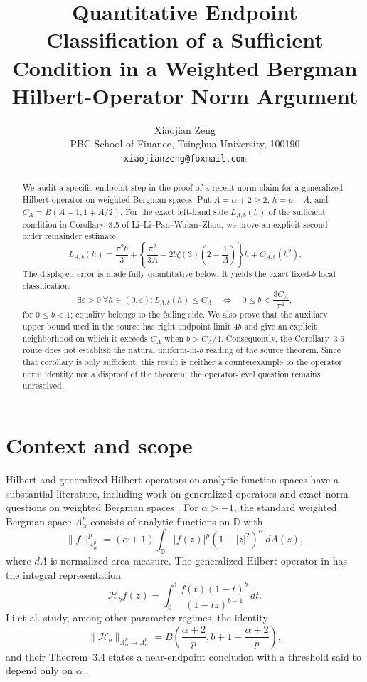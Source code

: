 \documentclass[11pt]{article}
\title{Quantitative Endpoint Classification of a Sufficient Condition in a Weighted Bergman Hilbert-Operator Norm Argument}
\author{Xiaojian Zeng\\
PBC School of Finance, Tsinghua University, 100190\\
\texttt{xiaojianzeng@foxmail.com}}
\date{}
\theoremstyle{remark}
\newcommand{\D}{\mathbb{D}}
\newcommand{\eps}{\varepsilon}
\begin{document}
\maketitle

\begin{abstract}
We audit a specific endpoint step in the proof of a recent norm claim for a
generalized Hilbert operator on weighted Bergman spaces.  Put
$A=\alpha+2\geq2$, $h=p-A$, and
$C_A=B(A-1,1+A/2)$.  For the exact left-hand side $L_{A,b}(h)$ of the
sufficient condition in Corollary~3.5 of Li--Li--Pan--Wulan--Zhou, we prove
an explicit second-order remainder estimate
\[
 L_{A,b}(h)=\frac{\pi^2b}{3}
 +\left\{\frac{\pi^2}{3A}-2b\zeta(3)\left(2-\frac1A\right)\right\}h
 +O_{A,b}(h^2).
\]
The displayed error is made fully quantitative below.  It yields the exact
fixed-$b$ local classification
\[
 \exists\eps>0\ \forall h\in(0,\eps):L_{A,b}(h)\leq C_A
 \quad\Longleftrightarrow\quad
 0\leq b<\frac{3C_A}{\pi^2},
\]
for $0\leq b<1$; equality belongs to the failing side.  We also prove that
the auxiliary upper bound used in the source has right endpoint limit $4b$
and give an explicit neighborhood on which it exceeds $C_A$ when
$b>C_A/4$.  Consequently, the Corollary~3.5 route does not establish the
natural uniform-in-$b$ reading of the source theorem.  Since that corollary
is only sufficient, this result is neither a counterexample to the operator
norm identity nor a disproof of the theorem; the operator-level question
remains unresolved.
\end{abstract}

\section{Context and scope}

Hilbert and generalized Hilbert operators on analytic function spaces have a
substantial literature, including work on generalized operators and exact
norm questions on weighted Bergman spaces
\cite{galanopoulos2014generalized,dai2024norm}.  For $\alpha>-1$, the
standard weighted Bergman space $A_\alpha^p$ consists of analytic functions
on $\D$ with
\[
 \|f\|_{A_\alpha^p}^p
  =(\alpha+1)\int_{\D}|f(z)|^p(1-|z|^2)^\alpha\,dA(z),
\]
where $dA$ is normalized area measure.  The generalized Hilbert operator in
\cite{li2026norm} has the integral representation
\[
 \mathcal H_bf(z)=\int_0^1
 \frac{f(t)(1-t)^b}{(1-tz)^{b+1}}\,dt.
\]
Li et al. study, among other parameter regimes, the identity
\begin{equation}
 \|\mathcal H_b\|_{A_\alpha^p\to A_\alpha^p}
 =B\left(\frac{\alpha+2}{p},
 b+1-\frac{\alpha+2}{p}\right),                         \label{eq:norm}
\end{equation}
and their Theorem~3.4 states a near-endpoint conclusion with a threshold
said to depend only on $\alpha$ \cite[Theorem~3.4]{li2026norm}.
\end{document}
